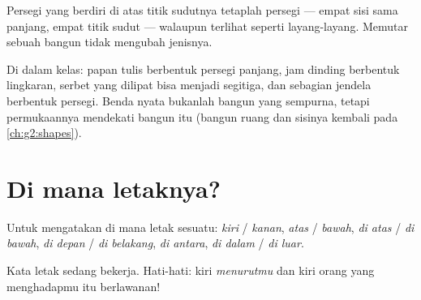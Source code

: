 \begin{example}\label{ex:g1:shapes:tilted}
Persegi yang berdiri di atas titik sudutnya tetaplah persegi ---
empat sisi sama panjang, empat titik sudut --- walaupun terlihat
seperti layang-layang. Memutar sebuah bangun tidak mengubah jenisnya.
\end{example}

\begin{example}\label{ex:g1:shapes:hunt}
Di dalam kelas: papan tulis berbentuk persegi panjang, jam dinding
berbentuk lingkaran, serbet yang dilipat bisa menjadi segitiga, dan
sebagian jendela berbentuk persegi. Benda nyata bukanlah bangun yang
sempurna, tetapi permukaannya mendekati bangun itu (bangun ruang dan
sisinya kembali pada \cref{ch:g2:shapes}).
\end{example}

\section{Di mana letaknya?}

\begin{definition}\label{def:g1:shapes:position}
Untuk mengatakan di mana letak sesuatu: \emph{kiri} / \emph{kanan},
\emph{atas} / \emph{bawah}, \emph{di atas} / \emph{di bawah},
\emph{di depan} / \emph{di belakang}, \emph{di antara},
\emph{di dalam} / \emph{di luar}.
\end{definition}

\begin{omfigure}

{\small Kata letak sedang bekerja. Hati-hati: kiri \emph{menurutmu}
dan kiri orang yang menghadapmu itu berlawanan!}
\end{omfigure}

